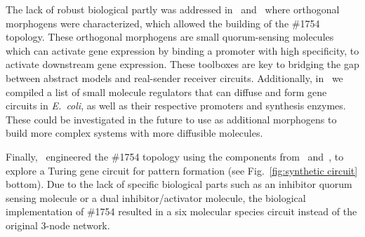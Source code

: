 The lack of robust biological partly was addressed in~\cite{Meyer2019} and~\cite{Du2020} where orthogonal morphogens were characterized, which allowed the building of the \#1754 topology.
These orthogonal morphogens are small quorum-sensing molecules which can activate gene expression by binding a promoter with high specificity, to activate downstream gene expression.
These toolboxes are key to bridging the gap between abstract models and real-sender receiver circuits.
Additionally, in~\cite{huidobro} we compiled a list of small molecule regulators that can diffuse and form gene circuits in \textit{E.~coli}, as well as their respective promoters and synthesis enzymes.
These could be investigated in the future to use as additional morphogens to build more complex systems with more diffusible molecules.

Finally,~\cite{Tica2020} engineered the \#1754 topology using the components from~\cite{Meyer2019} and~\cite{Du2020}, to explore a Turing gene circuit for pattern formation (see Fig.~\ref{fig:synthetic circuit} bottom).
Due to the lack of specific biological parts such as an inhibitor quorum sensing molecule or a dual inhibitor/activator molecule, the biological implementation of \#1754 resulted in a six molecular species circuit instead of the original 3-node network.

